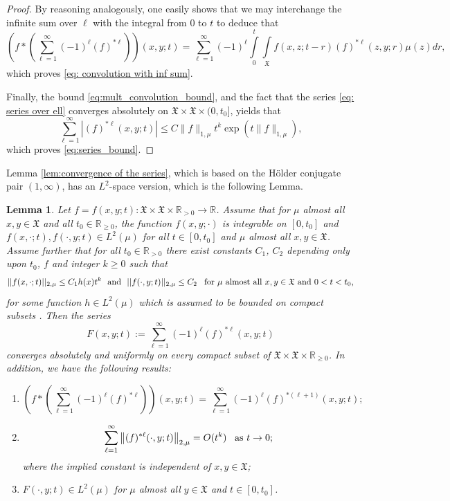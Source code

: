 \documentclass[11pt,reqno]{amsart}
\newtheorem{lemma}[theorem]{Lemma}
\theoremstyle{remark}
\theoremstyle{definition}
\numberwithin{theorem}{section} \numberwithin{equation}{section}
\newcommand{\X}{\mathfrak{X}}
\begin{document}
\begin{proof}
By reasoning analogously, one easily shows that we may interchange the infinite sum over $\ell$ with the integral from $0$ to $t$ to deduce that
$$
\left(f\ast\left(\sum_{\ell=1}^{\infty}(-1)^{\ell}(f)^{\ast\ell}\right)\right)(x,y;t)= \sum_{\ell=1}^{\infty} (-1)^\ell \int\limits_0^t \int\limits_{\X} f(x,z;t-r)(f)^{\ast \ell}(z,y;r)\mu(z)  dr,
$$
which proves \eqref{eq: convolution with inf sum}.

Finally, the bound \eqref{eq:mult_convolution_bound}, and the fact that the series \eqref{eq: series over ell} converges absolutely on $\X\times \X\times (0,t_0]$, yields that
$$
\sum_{\ell=1}^{\infty}\left|(f)^{\ast\ell}(x,y;t)\right|\leq C\|f\|_{1,\mu}t^k \exp(t \|f\|_{1,\mu}),
$$
which proves \eqref{eq:series_bound}.
\end{proof}

Lemma \ref{lem:convergence of the series}, which is based on the H\"older conjugate pair $(1,\infty)$,
has an $L^2$-space version, which is the following Lemma.

\begin{lemma}\label{lemma 2,2, conv series}
  Let $f=f(x,y;t):\X\times \X\times\mathbb{R}_{>0}\to\mathbb{R}$.
Assume that for  $\mu$ almost all $x,y\in \X$ and all $t_{0} \in \mathbb{R}_{\geq0}$, the function $f(x,y;\cdot)$ is integrable on
 $[0,t_{0}]$ and $f(x,\cdot;t), f(\cdot, y;t) \in L^2(\mu)$ for all $t\in [0,t_0]$ and  $\mu$ almost all $x,y\in\X$.
Assume further that for all $t_{0} \in \mathbb{R}_{>0}$ there exist constants $C_1$, $C_2$ depending only upon $t_0$, $f$ and integer $k\geq 0$ such that
$$
||f(x,\cdot;t)||_{2,\mu}\leq C_1h(x)t^{k}
\,\,\,\,
\text{\rm and}
\,\,\,\,
 ||f(\cdot,y;t)||_{2,\mu}\leq C_2
\,\,\,\,\,
\text{\rm for  $\mu$ almost all $x,y\in \X$ and $0<t<t_{0}$,}
$$
for some function $h\in L^2(\mu)$ which is assumed to be bounded on compact subsets .
Then the series
\begin{equation}\label{eq: series over ell2}
F(x,y;t):=\sum_{\ell=1}^{\infty}(-1)^{\ell}(f)^{\ast\ell}(x,y;t)
\end{equation}
converges absolutely and uniformly on every compact subset of $\X\times \X\times\mathbb{R}_{\geq0}$.
In addition, we have the following results:
\begin{enumerate}
\item
\begin{equation}
\left(f\ast\left(\sum_{\ell=1}^{\infty}(-1)^{\ell}(f)^{\ast\ell}\right)\right)(x,y;t)=
\sum_{\ell=1}^{\infty}(-1)^{\ell}(f)^{\ast(\ell+1)}(x,y;t);\label{eq: convolution with inf sum2}
\end{equation}
\item
\begin{equation}\label{eq:series_bound2}
\sum_{\ell=1}^{\infty}\left\|(f)^{\ast\ell}(\cdot,y;t)\right\|_{2,\mu}
=O(t^{k})
\,\,\,\,\,
\text{\rm as $t\to 0$;}
\end{equation}
where the implied constant is independent of $x,y\in \X$;
\item $F(\cdot, y;t) \in L^2(\mu)$ for  $\mu$ almost all $y\in\X$ and $t\in[0,t_0]$.
\end{enumerate}
\end{lemma}
\end{document}

